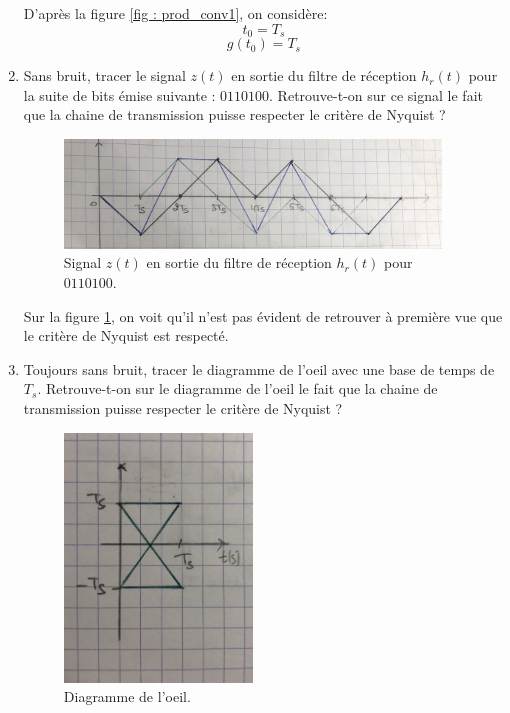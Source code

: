 \documentclass[frenchb]{article}
\begin{document}
\begin{enumerate}
        \setlength\parindent{0.5cm}
        D'après la figure \ref{fig : prod_conv1}, on considère:
        $$ \boxed{t_0 = T_s} $$
        $$ g(t_0)     = T_s  $$ 
        \item Sans bruit, tracer le signal $z(t)$ en sortie du filtre de réception $h_r(t)$ pour la suite de bits émise suivante : $0110100$. Retrouve-t-on sur ce signal le fait que la chaine de transmission puisse respecter le critère de Nyquist ?
        
        \begin{figure}[ht!]
		\centering
		\includegraphics[width=10cm]{C1Q3.jpg}		\caption{Signal $z(t)$ en sortie du filtre de réception $h_r(t)$ pour $0110100$. \label{fig : C1Q3}}
		\end{figure}

        \par\leavevmode\par
        \setlength\parindent{0.5cm}
        Sur la figure \ref{fig : C1Q3}, on voit qu'il n'est pas évident de retrouver à première vue que le critère de Nyquist est respecté. 
        \par\leavevmode\par
        \item Toujours sans bruit, tracer le diagramme de l'oeil avec une base de temps de $T_s$. Retrouve-t-on sur le diagramme de l'oeil le fait que la chaine de transmission puisse respecter le critère de Nyquist ?
        
        \begin{figure}[ht!]
		\centering
		\includegraphics[width=5cm]{C1Q4.jpg}		\caption{Diagramme de l'oeil. \label{fig : C1Q4}}
		\end{figure}


\end{enumerate}
\end{document}
